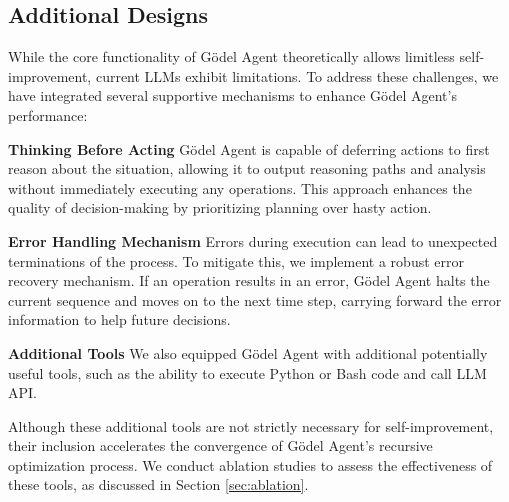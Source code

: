 \documentclass[11pt]{article}
\newcommand{\framework}{Gödel Agent\xspace}
\begin{document}
\subsection{Additional Designs}
\label{sec:addi}
While the core functionality of \framework theoretically allows limitless self-improvement, current LLMs exhibit limitations. To address these challenges, we have integrated several supportive mechanisms to enhance \framework’s performance:





\noindent\textbf{Thinking Before Acting} \quad
\framework is capable of deferring actions to first reason about the situation, allowing it to output reasoning paths and analysis without immediately executing any operations. This approach enhances the quality of decision-making by prioritizing planning over hasty action.

\noindent\textbf{Error Handling Mechanism} \quad
Errors during execution can lead to unexpected terminations of the process. To mitigate this, we implement a robust error recovery mechanism. If an operation results in an error, \framework halts the current sequence and moves on to the next time step, carrying forward the error information to help future decisions.

\noindent\textbf{Additional Tools} \quad
We also equipped \framework with additional potentially useful tools, such as the ability to execute Python or Bash code and call LLM API. 

Although these additional tools are not strictly necessary for self-improvement, their inclusion accelerates the convergence of \framework’s recursive optimization process. We conduct ablation studies to assess the effectiveness of these tools, as discussed in Section \ref{sec:ablation}.
\end{document}
